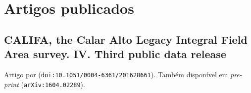 


\chapter{Artigos publicados}

\section{CALIFA, the Calar Alto Legacy Integral Field Area survey. IV. Third public data release}
\label{apendice:SFSanchezDR3}

Artigo por \cite{SFSanchez.DR3.2016} (\texttt{doi:10.1051/0004-6361/201628661}).
Também disponível em {\em pre-print} (\texttt{arXiv:1604.02289}).

\cleardoublepage



%
%
%
% 
%
%
%
%
% 
%
%
%
%
% 

